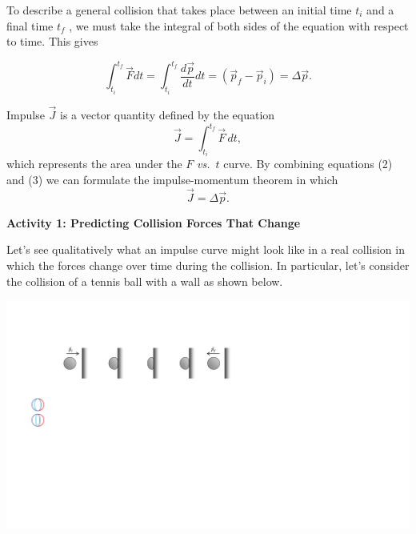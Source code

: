 To describe a general collision that takes place between an initial time $t_{i}$
and a final time $t_{f}$ , we must take the integral of both sides of the
equation with respect to time. This gives

\begin{equation}
\int _{t_{i}}^{t_{f}}{\vec  F}dt=\int _{t_{i}}^{t_{f}}\frac{d{\vec  p}}{dt}dt=\left( {{\vec  p}_{f}}-{{\vec  p}_{i}}\right) =\Delta {\vec  p}.
\end{equation}

Impulse ${\vec  J}$ is a vector quantity defined by the equation
\begin{equation}
{\vec  J}=\int_{t_{i}}^{t_{f}}{\vec  F}\,dt,
\end{equation}
which represents the area under the $F$ \textit{vs.}\ $t$ 
curve.
By combining equations (2) and (3) we can formulate the impulse-momentum
theorem in which
\begin{equation}
{\vec  J}=\Delta {\vec  p}.
\end{equation}

\pagebreak
\textbf{Activity 1: Predicting Collision Forces That Change }

Let's see qualitatively what an impulse curve might look like in a real collision
in which the forces change over time during the collision. In particular, let's
consider the collision of a tennis ball with a wall as shown below.

\vspace{0.3cm}
{\par\centering \includegraphics{impulse/ball_hitting_wall.pdf} \par}
\vspace{0.3cm}

